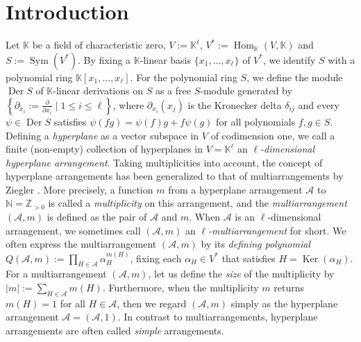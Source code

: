 \documentclass[12pt]{amsart}
\theoremstyle{definition}
\newcommand{\NN}{\mathbb{N}}
\newcommand{\ZZ}{\mathbb{Z}}
\newcommand{\KK}{\mathbb{K}}
\newcommand{\AAA}{\mathcal{A}}
\newcommand{\Der}{\operatorname{Der}}
\newcommand{\Ker}{\operatorname{Ker}}
\newcommand{\Sym}{\operatorname{Sym}}
\newcommand{\Hom}{\operatorname{Hom}}
\begin{document}
\section{Introduction} 
Let $\KK$ be a field of characteristic zero, 
$V:=\KK^\ell$, $V^*:=\Hom_\KK(V,\KK)$ and $S:=\Sym(V^*)$. 
By fixing a $\KK$-linear basis $\{x_1,\ldots,x_\ell\}$ of $V^*$, 
we identify $S$ with a polynomial ring $\KK[x_1,\ldots,x_\ell]$. 
For the polynomial ring $S$, 
we define the module $\Der S$ 
of $\KK$-linear derivations on $S$ as a free $S$-module generated by 
$\left\{\partial_{x_i}:=\frac{\partial}{\partial{x_i}} \mid 1 \leq i \leq \ell\right\}$, 
where $\partial_{x_i}(x_j)$ is the Kronecker delta $\delta_{ij}$ 
and every $\psi\in\Der S$ satisfies 
$\psi(fg)=\psi(f)g+f\psi(g)$ for all polynomials $f,g\in S$. 
Defining a \emph{hyperplane} as a %
vector subspace in $V$ of codimension one, 
we call a finite (non-empty) 
collection of hyperplanes in $V=\KK^\ell$ an 
\emph{$\ell$-dimensional hyperplane arrangement}. %
%
Taking multiplicities into account, the concept of 
hyperplane arrangements has been generalized to that of multiarrangements by Ziegler \cite{Ziegler}. 
More precisely, %
a function $m$ from a hyperplane arrangement 
$\AAA$ to $\NN=\ZZ_{>0}$ is called a \emph{multiplicity} on this arrangement, 
and the \emph{multiarrangement} $(\AAA,m)$ is defined 
as the pair of $\AAA$ and $m$. 
When $\AAA$ is an $\ell$-dimensional arrangement, 
we sometimes call $(\AAA,m)$ an \emph{$\ell$-multiarrangement} for short. 
We often express the multiarrangement $(\AAA,m)$ by its \emph{defining polynomial} 
$Q(\AAA,m):=\prod_{H\in\AAA}\alpha_H^{m(H)}$, fixing each $\alpha_H\in V^*$ 
that satisfies $H=\Ker(\alpha_H)$. 
For a multiarrangement $(\AAA,m)$, 
let us define the \emph{size} of the multiplicity by $|m|:=\sum_{H\in\AAA}m(H)$.
Furthermore, when the multiplicity $m$ %
returns $m(H)=1$ for all $H\in\AAA$, 
then we regard $(\AAA,m)$ simply as the hyperplane arrangement 
$\AAA=(\AAA,1)$. 
In contrast to multiarrangements, hyperplane arrangements are often 
called \emph{simple} arrangements. 
\end{document}
